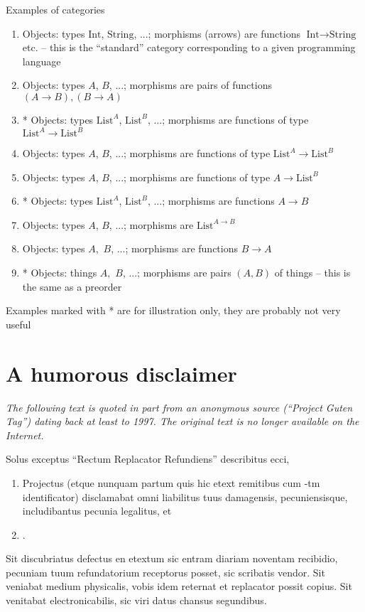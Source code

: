 Examples of categories
\begin{enumerate}
\item Objects: types $\text{Int}$, $\text{String}$, ...; morphisms (arrows)
are functions $\text{Int}\rightarrow\text{String}$ etc. – this is
the ``standard'' category corresponding to a given programming language
\item Objects: types $A$, $B$, ...; morphisms are pairs of functions $\left(A\rightarrow B\right),\left(B\rightarrow A\right)$
\item {*} Objects: types $\text{List}^{A}$, $\text{List}^{B}$, ...; morphisms
are functions of type $\text{List}^{A}\rightarrow\text{List}^{B}$
\item Objects: types $A$, $B$, ...; morphisms are functions of type $\text{List}^{A}\rightarrow\text{List}^{B}$
\item Objects: types $A$, $B$, ...; morphisms are functions of type $A\rightarrow\text{List}^{B}$
\item {*} Objects: types $\text{List}^{A}$, $\text{List}^{B}$, ...; morphisms
are functions $A\rightarrow B$
\item Objects: types $A$, $B$, ...; morphisms are $\text{List}^{A\rightarrow B}$
\item Objects: types $A,$ $B$, ...; morphisms are functions $B\rightarrow A$
\item {*} Objects: things $A,$ $B$, ...; morphisms are pairs $\left(A,B\right)$
of things – this is the same as a preorder
\end{enumerate}
Examples marked with {*} are for illustration only, they are probably
not very useful

\chapter{A humorous disclaimer}

\emph{The following text is quoted in part from an anonymous source
(``Project Guten Tag'') dating back at least to 1997. The original
text is no longer available on the Internet.}

\medskip{}


Solus exceptus ``Rectum Replacator Refundiens'' describitus ecci,
\begin{enumerate}
\item Projectus (etque nunquam partum quis hic etext remitibus cum -tm identificator) disclamabat omni liabilitus tuus damagensis,
pecuniensisque, includibantus pecunia legalitus, et 
\item {}. 
\end{enumerate}
Sit discubriatus defectus en etextum sic entram diariam noventam recibidio,
pecuniam tuum refundatorium receptorus posset, sic scribatis vendor.
Sit veniabat medium physicalis, vobis idem reternat et replacator
possit copius. Sit venitabat electronicabilis, sic viri datus chansus
segundibus. 

